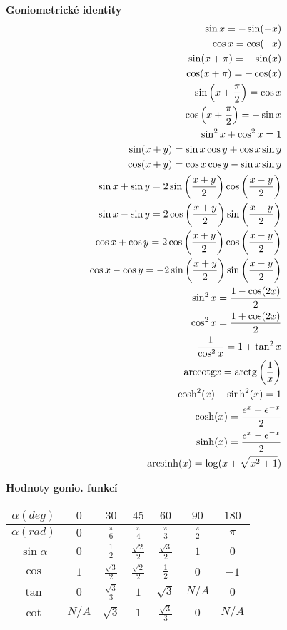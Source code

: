 \documentclass[8pt, a4paper]{extarticle}
\newcommand{\arctg}{\textup{arctg}}
\newcommand{\arccotg}{\textup{arccotg}}
\newcommand{\arcsinh}{\textup{arcsinh}}
\begin{document}
\begin{multicols}{3}
\textbf{Goniometrické identity}
\begin{align*}
\sin x = -\sin(-x) \\
\cos x = \cos(-x) \\
\sin(x+\pi)=-\sin(x) \\
\cos(x+\pi)=-\cos(x) \\
\sin\left(x+\frac{\pi}{2}\right)=\cos x \\
\cos\left(x+\frac{\pi}{2}\right)=-\sin x \\
\sin^2x+\cos^2x=1 \\
\sin(x+y)=\sin x\cos y + \cos x\sin y \\
\cos(x+y)=\cos x\cos y - \sin x\sin y \\
\sin x + \sin y = 2\sin\left(\frac{x+y}{2}\right)\cos\left(\frac{x-y}{2}\right) \\
\sin x - \sin y = 2\cos\left(\frac{x+y}{2}\right)\sin\left(\frac{x-y}{2}\right) \\
\cos x + \cos y = 2\cos\left(\frac{x+y}{2}\right)\cos\left(\frac{x-y}{2}\right) \\
\cos x - \cos y = -2\sin\left(\frac{x+y}{2}\right)\sin\left(\frac{x-y}{2}\right) \\
\sin^2x=\frac{1-\cos(2x)}{2} \\
\cos^2x=\frac{1+\cos(2x)}{2} \\
\frac{1}{\cos^2x} = 1 + \tan^2x\\
\arccotg x = \arctg\left(\frac{1}{x}\right)\\
\cosh^2(x) - \sinh^2(x) = 1\\
\cosh(x) = \frac{e^x + e^{-x}}{2}\\
\sinh(x) = \frac{e^x - e^{-x}}{2}\\
\arcsinh(x) = \log(x+\sqrt{x^2+1})
\end{align*}
 
\textbf{Hodnoty gonio. funkcí}
\begin{center}
\begin{tabular}{|c|c|c|c|c|c|c|}
\hline
$\alpha (deg)$ & $0$ & $30$ & $45$ & $60$ & $90$ & $180$ \\ \hline
$\alpha (rad)$ & $0$ & $\frac{\pi}{6}$ & $\frac{\pi}{4}$ & $\frac{\pi}{3}$ & $\frac{\pi}{2}$ & $\pi$ \\ \hline
$\sin\alpha $ & $0$ & $\frac{1}{2}$ & $\frac{\sqrt{2}}{2}$ & $\frac{\sqrt{3}}{2}$ & $1$ & $0$ \\ \hline
$\cos$ & $1$ & $\frac{\sqrt{3}}{2}$ & $\frac{\sqrt{2}}{2}$ & $\frac{1}{2}$ & $0$ & $-1$ \\ \hline
$\tan$ & $0$ & $\frac{\sqrt{3}}{3}$ & $1$ & $\sqrt{3}$ & $N/A$ & $0$ \\ \hline
$\cot$ & $N/A$ & $\sqrt{3}$ & $1$ & $\frac{\sqrt{3}}{3}$ & $0$ & $N/A$ \\ \hline
\end{tabular}
\end{center}
 

\end{multicols}
\end{document}
